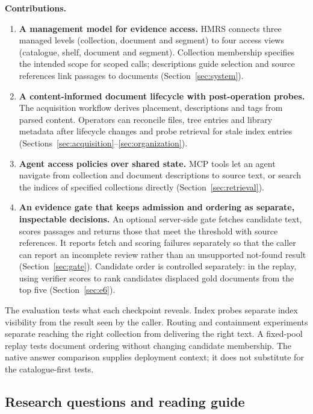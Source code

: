 \noindent\textbf{Contributions.}
\begin{enumerate}
\item \textbf{A management model for evidence access.} HMRS connects
three managed levels (collection, document and segment) to four access
views (catalogue, shelf, document and segment). Collection membership
specifies the intended scope for scoped calls; descriptions guide selection
and source references link passages to documents (Section~\ref{sec:system}).
\item \textbf{A content-informed document lifecycle with post-operation
probes.} The acquisition workflow derives placement, descriptions and
tags from parsed content. Operators can reconcile files, tree entries
and library metadata after lifecycle changes and probe retrieval for
stale index entries
(Sections~\ref{sec:acquisition}--\ref{sec:organization}).
\item \textbf{Agent access policies over shared state.} MCP tools let an
agent navigate from collection and document descriptions to source text,
or search the indices of specified collections directly
(Section~\ref{sec:retrieval}).
\item \textbf{An evidence gate that keeps admission and ordering as
separate, inspectable decisions.} An optional server-side gate fetches
candidate text, scores passages and returns those that meet the threshold
with source references. It reports fetch and scoring failures separately
so that the caller can report an incomplete review rather than an
unsupported not-found result (Section~\ref{sec:gate}). Candidate order is
controlled separately: in the replay, using verifier scores to rank
candidates displaced gold documents from the top five
(Section~\ref{sec:e6}).
\end{enumerate}

The evaluation tests what each checkpoint reveals. Index probes
separate index visibility from the result seen by the caller. Routing and containment
experiments separate reaching the right collection from delivering the
right text. A fixed-pool replay tests document ordering without changing
candidate membership. The native answer comparison supplies deployment
context; it does not substitute for the catalogue-first tests.

\subsection{Research questions and reading guide}
\label{sec:rq}


